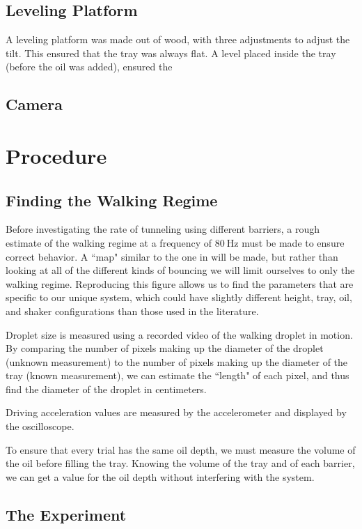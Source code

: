 \subsection{Leveling Platform}
    A leveling platform was made out of wood, with three adjustments to adjust the tilt. This ensured that the tray was always flat. A level placed inside the tray (before the oil was added), ensured the 

\subsection{Camera}       
 

\section{Procedure}

\subsection{Finding the Walking Regime}

Before investigating the rate of tunneling using different barriers, a rough estimate of the walking regime at a frequency of $80~\mathrm{Hz}$ must be made to ensure correct behavior. A ``map" similar to the one in  will be made, but rather than looking at all of the different kinds of bouncing we will limit ourselves to only the walking regime. Reproducing this figure allows us to find the parameters that are specific to our unique system, which could have slightly different height, tray, oil, and shaker configurations than those used in the literature. 

Droplet size is measured using a recorded video of the walking droplet in motion. By comparing the number of pixels making up the diameter of the droplet (unknown measurement) to the number of pixels making up the diameter of the tray (known measurement), we can estimate the ``length" of each pixel, and thus find the diameter of the droplet in centimeters. 

Driving acceleration values are measured by the accelerometer and displayed by the oscilloscope. 

To ensure that every trial has the same oil depth, we must measure the volume of the oil before filling the tray. Knowing the volume of the tray and of each barrier, we can get a value for the oil depth without interfering with the system. 

\subsection{The Experiment}


